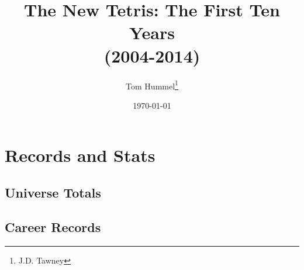 \documentclass[a4paper,twoside,titlepage]{book}
\title{The New Tetris: The First Ten Years 
\\(2004-2014)}
\author{Tom Hummel\thanks{J.D. Tawney}}
\date{\today}
\begin{document}
  \maketitle
  \tableofcontents \newpage
  
  
  
  
  
  
  \part{Records and Stats}
    \chapter{Universe Totals}
    \chapter{Career Records}
\end{document}
